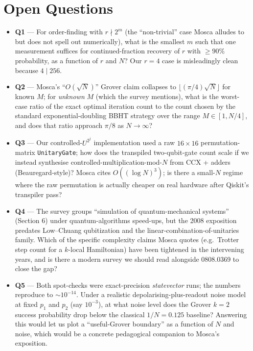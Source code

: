 \documentclass[11pt]{article}
\begin{document}
\section*{Open Questions}
\begin{itemize}
  \item \textbf{Q1} --- For order-finding with $r\nmid 2^m$ (the ``non-trivial'' case Mosca alludes to but does not spell out numerically), what is the smallest $m$ such that one measurement suffices for continued-fraction recovery of $r$ with $\ge 90\%$ probability, as a function of $r$ and $N$? Our $r{=}4$ case is misleadingly clean because $4\mid 256$.
  \item \textbf{Q2} --- Mosca's ``$O(\sqrt N)$'' Grover claim collapses to $\lfloor(\pi/4)\sqrt N\rfloor$ for known $M$; for \emph{unknown} $M$ (which the survey mentions), what is the worst-case ratio of the exact optimal iteration count to the count chosen by the standard exponential-doubling BBHT strategy over the range $M{\in}[1,N/4]$, and does that ratio approach $\pi/8$ as $N\to\infty$?
  \item \textbf{Q3} --- Our controlled-$U^{2^j}$ implementation used a raw $16{\times}16$ permutation-matrix \verb|UnitaryGate|; how does the transpiled two-qubit-gate count scale if we instead synthesise controlled-multiplication-mod-$N$ from CCX + adders (Beauregard-style)? Mosca cites $O((\log N)^3)$; is there a small-$N$ regime where the raw permutation is actually cheaper on real hardware after Qiskit's transpiler pass?
  \item \textbf{Q4} --- The survey groups ``simulation of quantum-mechanical systems'' (Section 6) under quantum-algorithms speed-ups, but the 2008 exposition predates Low--Chuang qubitization and the linear-combination-of-unitaries family. Which of the specific complexity claims Mosca quotes (e.g.\ Trotter step count for a $k$-local Hamiltonian) have been tightened in the intervening years, and is there a modern survey we should read alongside 0808.0369 to close the gap?
  \item \textbf{Q5} --- Both spot-checks were exact-precision \emph{statevector} runs; the numbers reproduce to $\sim 10^{-14}$. Under a realistic depolarising-plus-readout noise model at fixed $p_1$ and $p_2$ (say $10^{-3}$), at what noise level does the Grover $k{=}2$ success probability drop below the classical $1{/}N{=}0.125$ baseline? Answering this would let us plot a ``useful-Grover boundary'' as a function of $N$ and noise, which would be a concrete pedagogical companion to Mosca's exposition.
\end{itemize}
\end{document}
